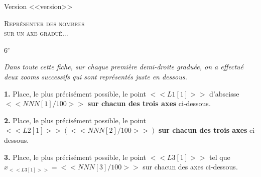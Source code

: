 
\begin{minipage}{0.15\linewidth}
Version <<version>>
\end{minipage}\hfill
\begin{minipage}{0.75\linewidth}
\begin{center}
	\textsc{\Large{Représenter des nombres\\ sur un axe gradué...}}
\end{center}
\end{minipage}\hfill
\begin{minipage}{0.1\linewidth}
{} \hfill 6$^e$
\end{minipage}

\medskip

\textit{Dans toute cette fiche, sur chaque première demi-droite graduée, on a effectué deux zooms successifs qui sont représentés juste en dessous.}

\vfill




\textbf{1.} Place, le plus précisément possible, le point $<<L1[1]>>$ d'abscisse $<<NNN[1]/100>>$ \textbf{sur chacun des trois axes} ci-dessous.

\vfill

{} \hfill 
{}
\hfill {}

\vfill

\textbf{2.} Place, le plus précisément possible, le point $<<L2[1]>> (<<NNN[2]/100>>)$ \textbf{sur chacun des trois axes} ci-dessous.

\vfill

{} \hfill 
{}
\hfill {}

\vfill

\textbf{3.} Place, le plus précisément possible, le point $<<L3[1]>>$ tel que $x_{<<L3[1]>>}=<<NNN[3]/100>>$ sur chacun des axes ci-dessous.

\vfill

{} \hfill 
{}
\hfill {}

\vfill


%
%
%
%
%
%
%
%
%
%
%
%
%

\vfill
 
